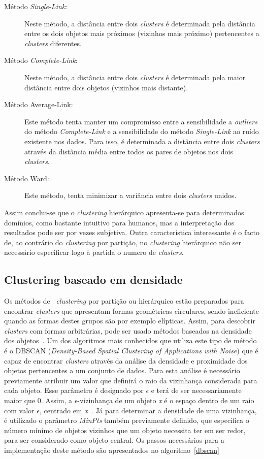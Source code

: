 \begin{description}
\item[Método \textit{Single-Link}:] Neste método, a distância entre dois \textit{clusters} é determinada pela distância entre os dois objetos mais próximos (vizinhos mais próximo) pertencentes a \textit{clusters} diferentes.
\item[Método \textit{Complete-Link}:] Neste método, a distância entre dois \textit{clusters} é determinada pela maior distância entre dois objetos (vizinhos mais distante).
\item[Método Average-Link:] Este método tenta manter um compromisso entre a sensibilidade a \textit{outliers} do método \textit{Complete-Link} e a sensibilidade do método \textit{Single-Link} ao ruído existente nos dados. Para isso, é determinada a distância entre dois \textit{clusters} através da distância média entre todos os pares de objetos nos dois \textit{clusters}.
\item[Método Ward:] Este método, tenta minimizar a variância entre dois \textit{clusters} unidos.
\end{description}

Assim conclui-se que o \textit{clustering} hierárquico apresenta-se para determinados domínios, como bastante intuitivo para humanos, mas a interpretação dos resultados pode ser por vezes subjetiva. Outra característica interessante é o facto de, ao contrário do \textit{clustering} por partição, no \textit{clustering} hierárquico não ser necessário especificar logo à partida o numero de \textit{clusters}. 

\subsection{Clustering baseado em densidade} \label{subsec:dbscan} 

Os métodos de ~\textit{clustering} por partição ou hierárquico estão preparados para encontrar \textit{clusters} que apresentam formas geométricas circulares, sendo ineficiente quando as formas destes grupos são por exemplo elípticas. Assim, para descobrir \textit{clusters} com formas arbitrárias, pode ser usado métodos baseados na densidade dos objetos~\cite{Han2006}. Um dos algoritmos mais conhecidos que utiliza este tipo de método é o DBSCAN (\textit{Density-Based Spatial Clustering of Applications with Noise}) que é capaz de encontrar \textit{clusters} através da análise da densidade e proximidade dos objetos pertencentes a um conjunto de dados. Para esta análise é necessário previamente atribuir um valor que definirá o raio da vizinhança considerada para cada objeto. Esse parâmetro é designado por $ \epsilon $ e terá de ser necessariamente maior que 0. Assim,  a $ \epsilon $-vizinhança de um objeto \textit{x} é o espaço dentro de um raio com valor $ \epsilon $, centrado em \textit{x}~\cite{Han2006}. Já para determinar a densidade de uma vizinhança, é utilizado o parâmetro \textit{MinPts} também previamente definido, que especifica o número mínimo de objetos vizinhos que um objeto necessita ter em ser redor, para ser considerado como objeto central.
Os passos necessários para a implementação deste método são apresentados no algoritmo~\ref{dbscan}

